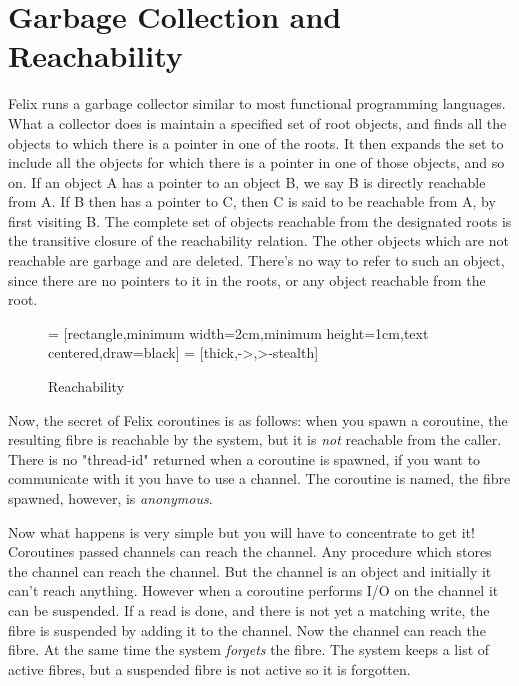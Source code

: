 \documentclass[oneside]{book}
\begin{document}
\section{Garbage Collection and Reachability}
Felix runs a garbage collector similar to most functional programming
languages. What a collector does is maintain a specified set of root
objects, and finds all the objects to which there is a pointer
in one of the roots. It then expands the set to include all the objects
for which there is a pointer in one of those objects, and so on.
If an object A has a pointer to an object B, we say B is directly
reachable from A. If B then has a pointer to C, then C is said to be
reachable from A, by first visiting B. The complete set of objects
reachable from the designated roots is the transitive closure of the
reachability relation. The other objects which are not reachable
are garbage and are deleted. There's no way to refer to such an object,
since there are no pointers to it in the roots, or any object reachable
from the root.

\begin{figure}[h]
\begin{center}
 = [rectangle,minimum width=2cm,minimum height=1cm,text centered,draw=black]
 = [thick,->,>-stealth]
\caption{Reachability}
\end{center}
\end{figure}

Now, the secret of Felix coroutines is as follows: when you spawn
a coroutine, the resulting fibre is reachable by the system,
but it is {\em not} reachable from the caller. There is no "thread-id"
returned when a coroutine is spawned, if you want to communicate
with it you have to use a channel. The coroutine is named, the 
fibre spawned, however, is {\em anonymous}.

Now what happens is very simple but you will have to concentrate
to get it! Coroutines passed channels can reach the channel.
Any procedure which stores the channel can reach the channel.
But the channel is an object and initially it can't reach anything.
However when a coroutine performs I/O on the channel it can be
suspended. If a read is done, and there is not yet a matching write,
the fibre is suspended by adding it to the channel. Now the channel
can reach the fibre. At the same time the system {\em forgets} the
fibre. The system keeps a list of active fibres, but a suspended
fibre is not active so it is forgotten.
\end{document}
